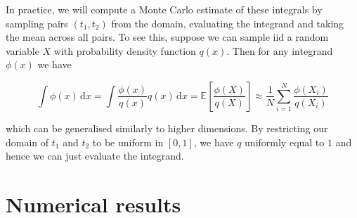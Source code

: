 In practice, we will compute a Monte Carlo estimate of these integrals by sampling pairs $(t_1, t_2)$ from the domain, evaluating the integrand and taking the mean across all pairs. To see this, suppose we can sample iid a random variable $X$ with probability density function $q(x)$. Then for any integrand $\phi(x)$ we have
    
$$
\int \phi(x)\,\mathrm dx = \int\frac{\phi(x)}{q(x)}q(x) \,\mathrm dx = \mathbb E\left[\frac{\phi(X)}{q(X)}\right] \approx \frac 1N\sum_{i=1}^N\frac{\phi(X_i)}{q(X_i)}
$$

which can be generalised similarly to higher dimensions. By restricting our domain of $t_1$ and $t_2$ to be uniform in $[0, 1]$, we have $q$ uniformly equal to $1$ and hence we can just evaluate the integrand.


\section{Numerical results}
